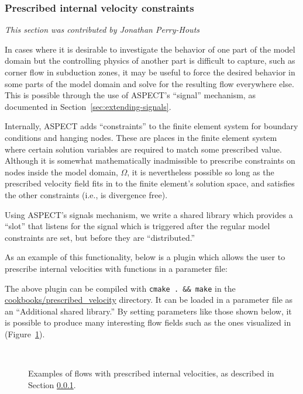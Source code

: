 \documentclass{article}
\newcommand{\aspect}{\textsc{ASPECT}}
\begin{document}
\subsubsection{Prescribed internal velocity constraints}
\label{sec:prescribed-velocities}
\textit{This section was contributed by Jonathan Perry-Houts}

In cases where it is desirable to investigate the behavior of one part of the model
domain but the controlling physics of another part is difficult to capture,
such as corner flow in subduction zones, it may be useful to force the desired
behavior in some parts of the model domain and solve for the resulting flow
everywhere else. This is possible through the use of \aspect{}'s ``signal'' mechanism,
as documented in Section~\ref{sec:extending-signals}.

Internally, \aspect{} adds ``constraints'' to the finite element system for boundary
conditions and hanging nodes. These are places in the finite element system where
certain solution variables are required to match some prescribed value. Although it
is somewhat mathematically inadmissible to prescribe constraints on nodes inside
the model domain, $\Omega$, it is nevertheless possible so long as the prescribed
velocity field fits in to the finite element's solution space, and satisfies the
other constraints (i.e., is divergence free).

Using \aspect{}'s signals mechanism, we write a shared library which provides a
``slot'' that listens for the signal which is triggered after the regular model
constraints are set, but before they are ``distributed.''

As an example of this functionality, below is a plugin which allows the user to prescribe
internal velocities with functions in a parameter file:


The above plugin can be compiled with \texttt{cmake . \&\& make} in the
\url{cookbooks/prescribed_velocity} directory. It can be loaded in a parameter file
as an ``Additional shared library.'' By setting parameters like those shown below,
it is possible to produce many interesting flow fields such as the ones visualized in
(Figure~\ref{fig:prescribed-velocity}).


\begin{figure}
    \centering
  ~
    \caption{Examples of flows with prescribed internal velocities, as described in Section \ref{sec:prescribed-velocities}.}
    \label{fig:prescribed-velocity}
\end{figure}
\end{document}
